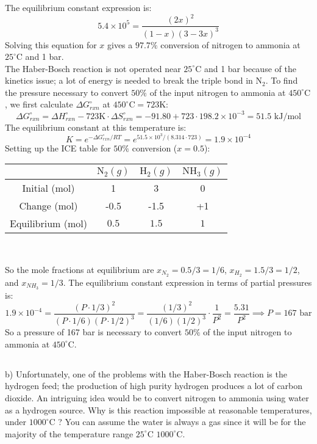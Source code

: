 \documentclass[12pt]{article}
\begin{document}
The equilibrium constant expression is:
\begin{equation}
5.4 \times 10^{5} = \frac{(2x)^{2}}{(1-x)(3-3x)^{3}}
\end{equation}
Solving this equation for $x$ gives a $97.7\%$ conversion of nitrogen to ammonia at $25^{\circ} \mathrm{C}$ and 1 bar.\\
The Haber-Bosch reaction is not operated near $25^{\circ} \mathrm{C}$ and 1 bar because of the kinetics issue; a lot of energy is needed to break the triple bond in $\mathrm{N}_{2}$.
To find the pressure necessary to convert $50 \%$ of the input nitrogen to ammonia at $450^{\circ} \mathrm{C}$, we first calculate $\Delta G_{rxn}^{\circ}$ at $450^{\circ} \mathrm{C}=723 \mathrm{K}$:
\begin{equation}
\Delta G_{rxn}^{\circ} = \Delta H_{rxn}^{\circ} - 723 \mathrm{K} \cdot \Delta S_{rxn}^{\circ} = -91.80 + 723 \cdot 198.2 \times 10^{-3} = 51.5 \text{ kJ/mol}
\end{equation}
The equilibrium constant at this temperature is:
\begin{equation}
K = e^{-\Delta G_{rxn}^{\circ}/RT} = e^{51.5 \times 10^{3}/(8.314 \cdot 723)} = 1.9 \times 10^{-4}
\end{equation}
Setting up the ICE table for $50 \%$ conversion ($x=0.5$):
\begin{center}
\begin{tabular}{|c|c|c|c|}
\hline
    & $\mathrm{N_{2}}(g)$ & $\mathrm{H_{2}}(g)$ & $\mathrm{NH_{3}}(g)$ \\
\hline
Initial (mol) & 1 & 3 & 0 \\
\hline
Change (mol) & -0.5 & -1.5 & +1 \\
\hline
Equilibrium (mol) & $0.5$ & $1.5$ & $1$ \\
\hline
\end{tabular}\\
\end{center}
So the mole fractions at equilibrium are $x_{N_{2}} = 0.5/3 = 1/6$, $x_{H_{2}} = 1.5/3 = 1/2$, and $x_{NH_{3}} = 1/3$. The equilibrium constant expression in terms of partial pressures is:
\begin{equation}
1.9 \times 10^{-4} = \frac{(P \cdot 1/3)^{2}}{(P \cdot 1/6)(P \cdot 1/2)^{3}} = \frac{(1/3)^{2}}{(1/6)(1/2)^{3}} \cdot \frac{1}{P^{2}} = \frac{5.31}{P^{2}} \implies P = 167 \text{ bar}
\end{equation} 
So a pressure of 167 bar is necessary to convert $50 \%$ of the input nitrogen to ammonia at $450^{\circ} \mathrm{C}$.
\subsection{}
b) Unfortunately, one of the problems with the Haber-Bosch reaction is the hydrogen feed; the production of high purity hydrogen produces a lot of carbon dioxide. An intriguing idea would be to convert nitrogen to ammonia using water as a hydrogen source. Why is
this reaction impossible at reasonable temperatures, under $1000^{\circ} \mathrm{C}$ ? You can assume the water is always a gas since it will be for the majority of the temperature range $25^{\circ} \mathrm{C}$ $1000^{\circ} \mathrm{C}$.\\
\end{document}

